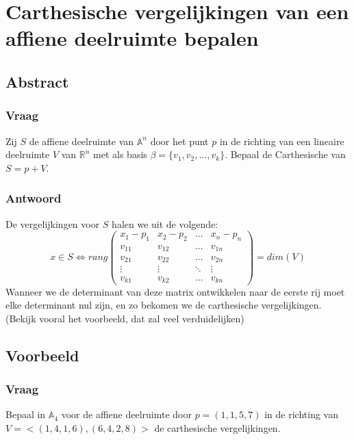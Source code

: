 \documentclass[main.tex]{subfiles}
\begin{document}
\newpage
\section{Carthesische vergelijkingen van een affiene deelruimte bepalen}
\subsection*{Abstract}
\subsubsection*{Vraag}
\begin{center}
  Zij $S$ de affiene deelruimte van $\mathbb{A}^{n}$ door het punt $p$ in de richting van een lineaire deelruimte $V$ van $\mathbb{R}^{n}$ met als basis $\beta=\{v_{1},v_{2},\dotsc,v_{k}\}$.
  Bepaal de Carthesische van $S=p+V$.
\end{center}

\subsubsection*{Antwoord}
De vergelijkingen voor $S$ halen we uit de volgende:
\[
x \in S \Leftrightarrow
rang
\begin{pmatrix}
  x_{1}-p_{1} & x_{2}-p_{2} & \hdots & x_{n}-p_{n} \\
  v_{11} & v_{12} & \hdots & v_{1n} \\
  v_{21} & v_{22} & \hdots & v_{2n} \\
  \vdots & \vdots & \ddots & \vdots \\ 
  v_{k1} & v_{k2} & \hdots & v_{kn}
\end{pmatrix}
= dim(V)
\]
Wanneer we de determinant van deze matrix ontwikkelen naar de eerste rij moet elke determinant nul zijn, en zo bekomen we de carthesische vergelijkingen.
(Bekijk vooral het voorbeeld, dat zal veel verduidelijken)

\subsection*{Voorbeeld}
\subsubsection*{Vraag}
\begin{center}
  Bepaal in $\mathbb{A}_{4}$ voor de affiene deelruimte door $p=(1,1,5,7)$ in de richting van $V=<(1,4,1,6),(6,4,2,8)>$ de carthesische vergelijkingen.
\end{center}
\end{document}
